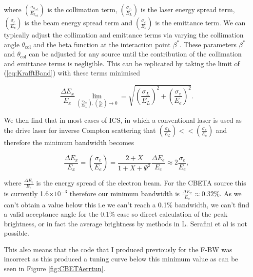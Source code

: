 \documentclass[10pt]{article}
\begin{document}
where $\left(\frac{\sigma_{\theta_{\mathrm{col}}}}{E_{\theta_{\mathrm{col}}}}\right)$ is the collimation term, $\left(\frac{\sigma_{L}}{E_{L}}\right)$ is the laser energy spread term, $\left(\frac{\sigma_{e}}{E_{e}}\right)$ is the beam energy spread term and $\left(\frac{\sigma_{\varepsilon}}{E_{\varepsilon}}\right)$ is the emittance term. We can typically adjust the collimation and emittance terms via varying the collimation angle $\theta_{\mathrm{col}}$ and the beta function at the interaction point $\beta^{*}$. These parameters $\beta^{*}$ and $\theta_{\mathrm{col}}$ can be adjusted for any source until the contribution of the collimation and emittance terms is negligible. This can be replicated by taking the limit of (\ref{eq:KrafftBand}) with these terms minimised

\begin{equation}
\frac{\Delta E_{x}}{E_{x}} \lim_{\left(\frac{\sigma_{\theta_{\mathrm{col}}}}{E_{\theta_{\mathrm{col}}}}\right),\left(\frac{\sigma_{\varepsilon}}{E_{\varepsilon}}\right) \to 0} = \sqrt{\left(\frac{\sigma_{L}}{E_{L}}\right)^{2}+\left(\frac{\sigma_{e}}{E_{e}}\right)^{2}}.
\label{eq:minemitcol}  
\end{equation}

We then find that in most cases of ICS, in which a conventional laser is used as the drive laser for inverse Compton scattering that $\left(\frac{\sigma_{L}}{E_{L}}\right) << \left(\frac{\sigma_{e}}{E_{e}}\right)$ and therefore the minimum bandwidth becomes

\begin{equation}
\frac{\Delta E_{x}}{E_{x}} = \left(\frac{\sigma_{e}}{E_{e}}\right) = \frac{2+X}{1+X+\Psi^{2}}\frac{\Delta E_{e}}{E_{e}} \approx 2\frac{\sigma_{e}}{E_{e}},
\label{eq:minbeam}
\end{equation}

where $\frac{\Delta E_{e}}{E_{e}}$ is the energy spread of the electron beam. For the CBETA source this is currently 1.6$\times 10^{-3}$ therefore our minimum bandwidth is $\frac{\Delta E_{x}}{E_{x}} \approx 0.32\%$. As we can't obtain a value below this i.e we can't reach a 0.1\% bandwidth, we can't find a valid acceptance angle for the 0.1\% case so direct calculation of the peak brightness, or in fact the average brightness  by methods in L. Serafini et al \cite{curatolo2017analytical} is not possible.

This also means that the code that I produced previously for the F-BW was incorrect as this produced a tuning curve below this minimum value as can be seen in Figure \ref{fig:CBETAerrtun}.
\end{document}
